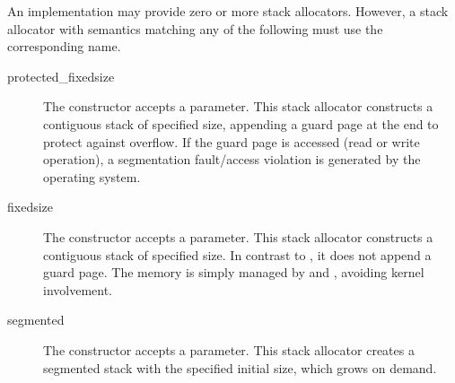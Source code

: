An implementation may provide zero or more stack allocators. However, a stack
allocator with semantics matching any of the following must use the
corresponding name.
\begin{description}
  \item[protected\_fixedsize] The constructor accepts a 
        parameter. This stack allocator constructs a contiguous stack of
        specified size, appending a guard page at the end to protect against
        overflow. If the guard page is accessed (read or write operation), a
        segmentation fault/access violation is generated by the operating
        system.
  \item[fixedsize] The constructor accepts a  parameter.
        This stack allocator constructs a contiguous stack of specified size.
        In contrast to , it does not append a guard
        page. The memory is simply managed by 
        and , avoiding kernel involvement.
  \item[segmented] The constructor accepts a  parameter.
        This stack allocator creates a segmented stack\cite{gccsplit} with the
        specified initial size, which grows on demand.
\end{description}
